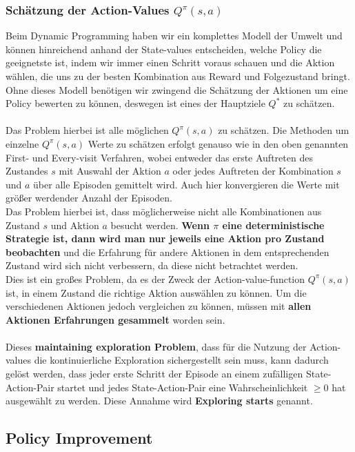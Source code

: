 \documentclass[10pt]{scrartcl}
\begin{document}
\subsubsection{Schätzung der Action-Values $Q^{\pi}(s,a)$}
Beim Dynamic Programming haben wir ein komplettes Modell der Umwelt und können hinreichend anhand der State-values entscheiden, welche Policy die geeignetste ist, indem wir immer einen Schritt voraus schauen und die Aktion wählen, die uns zu der besten Kombination aus Reward und Folgezustand bringt.\\
Ohne dieses Modell benötigen wir zwingend die Schätzung der Aktionen um eine Policy bewerten zu können, deswegen ist eines der Hauptziele $Q^{*}$ zu schätzen.\\
\\
Das Problem hierbei ist alle möglichen $Q^{\pi}(s,a)$ zu schätzen. Die Methoden um einzelne $Q^{\pi}(s,a)$ Werte zu schätzen erfolgt genauso wie in den oben genannten First- und Every-visit Verfahren, wobei entweder das erste Auftreten des Zustandes $s$ mit Auswahl der Aktion $a$ oder jedes Auftreten der Kombination $s$ und $a$ über alle Episoden gemittelt wird. Auch hier konvergieren die Werte mit größer werdender Anzahl der Episoden.\\
Das Problem hierbei ist, dass möglicherweise nicht alle Kombinationen aus Zustand $s$ und Aktion $a$ besucht werden. \textbf{Wenn $\pi$ eine deterministische Strategie ist, dann wird man nur jeweils eine Aktion pro Zustand beobachten} und die Erfahrung für andere Aktionen in dem entsprechenden Zustand wird sich nicht verbessern, da diese nicht betrachtet werden.\\
Dies ist ein großes Problem, da es der Zweck der Action-value-function $Q^{\pi}(s,a)$ ist, in einem Zustand die richtige Aktion auswählen zu können. Um die verschiedenen Aktionen jedoch vergleichen zu können, müssen mit \textbf{allen Aktionen Erfahrungen gesammelt} worden sein.\\
\\
Dieses \textbf{\glqq maintaining exploration\grqq\xspace Problem}, dass für die Nutzung der Action-values die kontinuierliche Exploration sichergestellt sein muss, kann dadurch gelöst werden, dass jeder erste Schritt der Episode an einem zufälligen State-Action-Pair startet und jedes State-Action-Pair eine Wahrscheinlichkeit $\geq 0$ hat ausgewählt zu werden. Diese Annahme wird \textbf{Exploring starts} genannt.

\subsection{Policy Improvement}
\end{document}
